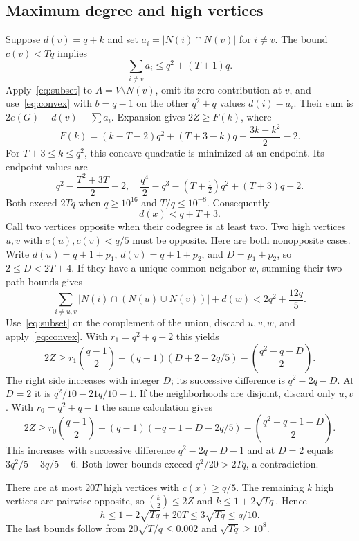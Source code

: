 \documentclass[11pt]{article}
\theoremstyle{remark}\newtheorem*{remark}{Remark}
\begin{document}
\subsection{Maximum degree and high vertices}
Suppose $d(v)=q+k$ and set $a_i=|N(i)\cap N(v)|$ for $i\ne v$. The bound $c(v)<Tq$ implies
\[
 \sum_{i\ne v}a_i\leq q^2+(T+1)q.
\]
Apply~\eqref{eq:subset} to $A=V\setminus N(v)$, omit its zero contribution at $v$, and use~\eqref{eq:convex} with $b=q-1$ on the other $q^2+q$ values $d(i)-a_i$. Their sum is $2e(G)-d(v)-\sum a_i$. Expansion gives $2Z\geq F(k)$, where
\[
 F(k)=(k-T-2)q^2+(T+3-k)q+\frac{3k-k^2}{2}-2.
\]
For $T+3\leq k\leq q^2$, this concave quadratic is minimized at an endpoint. Its endpoint values are
\[
 q^2-\frac{T^2+3T}{2}-2,
\quad
 \frac{q^4}{2}-q^3-(T+\tfrac12)q^2+(T+3)q-2.
\]
Both exceed $2Tq$ when $q\geq10^{16}$ and $T/q\leq10^{-8}$. Consequently
\begin{equation}\label{eq:max}
 d(x)<q+T+3.
\end{equation}
Call two vertices opposite when their codegree is at least two. Two high vertices $u,v$ with $c(u),c(v)<q/5$ must be opposite. Here are both nonopposite cases. Write $d(u)=q+1+p_1$, $d(v)=q+1+p_2$, and $D=p_1+p_2$, so $2\leq D<2T+4$. If they have a unique common neighbor $w$, summing their two-path bounds gives
\[
 \sum_{i\ne u,v}|N(i)\cap(N(u)\cup N(v))|+d(w)
 <2q^2+\frac{12q}{5}.
\]
Use~\eqref{eq:subset} on the complement of the union, discard $u,v,w$, and apply~\eqref{eq:convex}. With $r_1=q^2+q-2$ this yields
\[
 2Z\geq r_1\binom{q-1}{2}-(q-1)(D+2+2q/5)
       -\binom{q^2-q-D}{2}.
\]
The right side increases with integer $D$; its successive difference is $q^2-2q-D$. At $D=2$ it is $q^2/10-21q/10-1$.
If the neighborhoods are disjoint, discard only $u,v$. With $r_0=q^2+q-1$ the same calculation gives
\[
 2Z\geq r_0\binom{q-1}{2}+(q-1)(-q+1-D-2q/5)
       -\binom{q^2-q-1-D}{2}.
\]
This increases with successive difference $q^2-2q-D-1$ and at $D=2$ equals $3q^2/5-3q/5-6$. Both lower bounds exceed $q^2/20>2Tq$, a contradiction.

There are at most $20T$ high vertices with $c(x)\geq q/5$. The remaining $k$ high vertices are pairwise opposite, so $\binom k2\leq2Z$ and $k\leq1+2\sqrt{Tq}$. Hence
\begin{equation}\label{eq:prehigh}
 h\leq1+2\sqrt{Tq}+20T\leq3\sqrt{Tq}\leq q/10.
\end{equation}
The last bounds follow from $20\sqrt{T/q}\leq0.002$ and $\sqrt{Tq}\geq10^8$.
\end{document}
